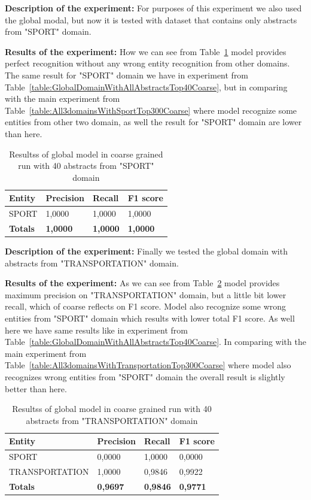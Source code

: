\documentclass[thesis=M,english]{FITthesis}[2018/05/30]
\begin{document}
	\textbf{Description of the experiment:} For purposes of this experiment we also used the global modal, but now it is tested with dataset that contains only abstracts from "SPORT" domain.   

	\textbf{Results of the experiment:} How we can see from Table~\ref{table:GlobalDomainWithSportTop40Coarse} model provides perfect recognition without any wrong entity recognition from other domains. The same result for "SPORT" domain we have in experiment from Table~\ref{table:GlobalDomainWithAllAbstractsTop40Coarse}, but in comparing with the main experiment from Table~\ref{table:All3domainsWithSportTop300Coarse} where model recognize some entities from other two domain, as well the result for "SPORT" domain are lower than here. 

	\begin{table}[H]\centering
		\begin{tabular}{|l|l|l|l|}
			\hline {\textbf{Entity}} & {\textbf{Precision}} & {\textbf{Recall}} & {\textbf{F1 score}}\\\hline
				SPORT & 1,0000 & 1,0000 & 1,0000\\\hline
				\textbf{Totals} & \textbf{1,0000} & \textbf{1,0000} & \textbf{1,0000}\\\hline
		\end{tabular}
		\caption{Resultss of global model in coarse grained run with 40 abstracts from "SPORT" domain \label{table:GlobalDomainWithSportTop40Coarse}}
	\end{table}	


	\textbf{Description of the experiment:} Finally we tested the global domain with abstracts from "TRANSPORTATION" domain.

	\textbf{Results of the experiment:} As we can see from Table~\ref{table:GlobalDomainWithTransportationTop40Coarse} model provides maximum precision on "TRANSPORTATION" domain, but a little bit lower recall, which of coarse reflects on F1 score. Model also recognize some wrong entities from "SPORT" domain which results with lower total F1 score. As well here we have same results like in experiment from Table~\ref{table:GlobalDomainWithAllAbstractsTop40Coarse}. In comparing with the main experiment from Table~\ref{table:All3domainsWithTransportationTop300Coarse} where model also recognizes wrong entities from "SPORT" domain the overall result is slightly better than here.

	\begin{table}[H]\centering
		\begin{tabular}{|l|l|l|l|}
			\hline {\textbf{Entity}} & {\textbf{Precision}} & {\textbf{Recall}} & {\textbf{F1 score}}\\\hline
				SPORT & 0,0000 & 1,0000 & 0,0000\\
				TRANSPORTATION & 1,0000 & 0,9846 & 0,9922\\\hline
				\textbf{Totals} & \textbf{0,9697} & \textbf{0,9846} & \textbf{0,9771}\\\hline
		\end{tabular}
		\caption{Resultss of global model in coarse grained run with 40 abstracts from "TRANSPORTATION" domain \label{table:GlobalDomainWithTransportationTop40Coarse}}
	\end{table}	
		
\end{document}
